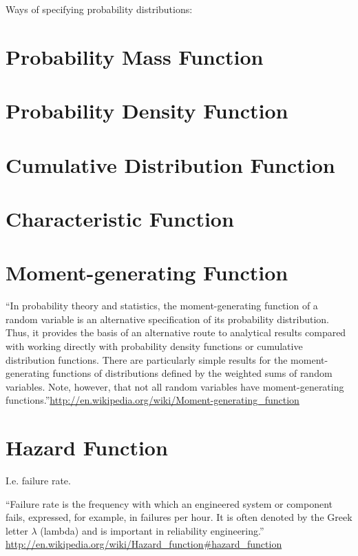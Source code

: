 \documentclass[reqno,12pt]{tufte-book}
\numberwithin{equation}{subsection}
\begin{document}
Ways of specifying probability distributions:

\section{Probability Mass Function}


\section{Probability Density Function}

\section{Cumulative Distribution Function}

\section{Characteristic Function}

\section{Moment-generating Function}

``In probability theory and statistics, the moment-generating function of a random variable is an alternative specification of its probability distribution. Thus, it provides the basis of an alternative route to analytical results compared with working directly with probability density functions or cumulative distribution functions. There are particularly simple results for the moment-generating functions of distributions defined by the weighted sums of random variables. Note, however, that not all random variables have moment-generating functions.''\url{http://en.wikipedia.org/wiki/Moment-generating_function}

\section{Hazard Function}

I.e. failure rate.

``Failure rate is the frequency with which an engineered system or
component fails, expressed, for example, in failures per hour. It is
often denoted by the Greek letter $\lambda$ (lambda) and is important in
reliability engineering.''
\url{http://en.wikipedia.org/wiki/Hazard_function#hazard_function}
\end{document}
